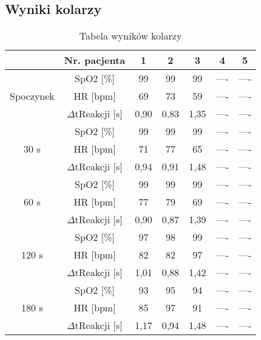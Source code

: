     \newpage
\subsection{Wyniki kolarzy}
\begin{table}[ht]
    \centering
    \caption{Tabela wyników kolarzy}
    \begin{tabular}{|c|c|c|c|c|c|c|}
        \hline
                              & Nr. pacjenta        & 1 & 2 & 3 & 4 & 5 \\ \hline
        \multirow{3}{*}{Spoczynek}  & SpO2 $[$\%$]$ & 99   & 99  & 99  & ----  & ----  \\ \cline{2-7} 
                              & HR $[$bpm$]$     & 69  & 73  & 59  & ----  &  ---- \\ \cline{2-7} 
                              & $\Delta$tReakcji $[$s$]$  & 0,90  & 0,83  & 1,35  & ----  & ----  \\ \hline
        \multirow{3}{*}{30 s}  & SpO2 $[$\%$]$ & 99  & 99  &  99 & ----  &  ---- \\ \cline{2-7} 
                              & HR $[$bpm$]$     & 71  &  77 & 65  & ---- & ----  \\ \cline{2-7} 
                              & $\Delta$tReakcji $[$s$]$   & 0,94  & 0,91  & 1,48  & ----  & ----  \\ \hline
        \multirow{3}{*}{60 s}  & SpO2 $[$\%$]$ & 99  & 99  & 99  & ----  & ----  \\ \cline{2-7} 
                              & HR $[$bpm$]$     & 77  & 79  & 69  & ----  & ----  \\ \cline{2-7} 
                              & $\Delta$tReakcji $[$s$]$   & 0,90  & 0,87  & 1,39  & ----  & ----  \\ \hline
        \multirow{3}{*}{120 s}  & SpO2 $[$\%$]$ & 97  & 98  & 99  & ----  & ---- \\ \cline{2-7} 
                              & HR $[$bpm$]$     & 82  & 82  & 97  & ----  & ----  \\ \cline{2-7} 
                              & $\Delta$tReakcji $[$s$]$   & 1,01 & 0,88  & 1,42  & ----  & ----  \\ \hline
        \multirow{3}{*}{180 s} & SpO2 $[$\%$]$ &  93 & 95  & 94  & ----  & ----  \\ \cline{2-7} 
                              & HR $[$bpm$]$     & 85  & 97  & 91  & ----  & ----  \\ \cline{2-7} 
                              & $\Delta$tReakcji $[$s$]$   & 1,17  & 0,94  & 1,48  & ----  & ----  \\ \hline

\end{tabular}
\end{table}
